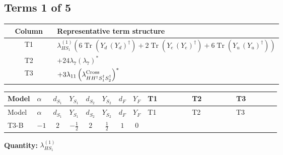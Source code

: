 \documentclass[8pt]{article}
\begin{document}
\begin{landscape}
\subsection*{Terms 1 of 5}
\begin{center}
\begin{tabular}{@{}c >{\raggedright\arraybackslash}p{0.82\linewidth}@{}}
\toprule
Column & Representative term structure \\
\midrule
T1 & \(\displaystyle {\lambda_{HS_1}^{(1)}} (6 \operatorname{Tr}\!\left({Y_d}\,\left({Y_d}\right)^{\dagger}\right)+2 \operatorname{Tr}\!\left({Y_e}\,\left({Y_e}\right)^{\dagger}\right)+6 \operatorname{Tr}\!\left({Y_u}\,\left({Y_u}\right)^{\dagger}\right))\) \\
\midrule
T2 & \(\displaystyle +24 {\lambda_7} \left({\lambda_7}\right)^{*}\) \\
\midrule
T3 & \(\displaystyle +3 {\lambda_{11}} \left({\lambda_{H H^\dagger S_1^\dagger S_2^\dagger}^{\rm Cross}}\right)^{*}\) \\
\midrule
\bottomrule
\end{tabular}
\end{center}
\smallskip
\tiny
\begin{longtable}{@{}llcccccc >{\raggedright\arraybackslash}p{0.21\linewidth} >{\raggedright\arraybackslash}p{0.21\linewidth} >{\raggedright\arraybackslash}p{0.21\linewidth}@{}}
\toprule
Model & $\alpha$ & $d_{S_1}$ & $Y_{S_1}$ & $d_{S_2}$ & $Y_{S_2}$ & $d_F$ & $Y_F$ & T1 & T2 & T3 \\
\midrule
\endfirsthead
\toprule
Model & $\alpha$ & $d_{S_1}$ & $Y_{S_1}$ & $d_{S_2}$ & $Y_{S_2}$ & $d_F$ & $Y_F$ & T1 & T2 & T3 \\
\midrule
\endhead
T3-B & $-1$ & $2$ & $-\frac{1}{2}$ & $2$ & $\frac{1}{2}$ & $1$ & $0$ & \scriptsize\adjustbox{max width=\linewidth}{$\begin{gathered} {\lambda_{HS_1}^{(1)}} (6 \operatorname{Tr}\!\left({Y_d}\,\left({Y_d}\right)^{\dagger}\right)+2 \operatorname{Tr}\!\left({Y_e}\,\left({Y_e}\right)^{\dagger}\right)+6 \operatorname{Tr}\!\left({Y_u}\,\left({Y_u}\right)^{\dagger}\right))\end{gathered}$} & \scriptsize\adjustbox{max width=\linewidth}{$\begin{gathered} +24 {\lambda_7} \left({\lambda_7}\right)^{*}\end{gathered}$} & \scriptsize\adjustbox{max width=\linewidth}{$\begin{gathered} +3 {\lambda_{11}} \left({\lambda_{H H^\dagger S_1^\dagger S_2^\dagger}^{\rm Cross}}\right)^{*}\end{gathered}$} \\
\midrule
\bottomrule
\end{longtable}
\clearpage
\noindent\textbf{Quantity: }$\lambda_{HS_1}^{(1)}$\par\smallskip

\end{landscape}
\end{document}
